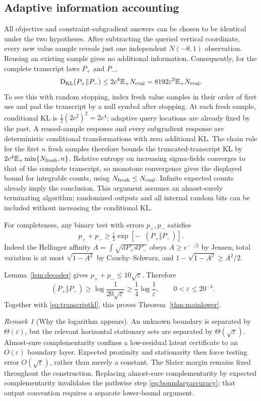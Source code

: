 \documentclass[11pt,a4paper]{article}
\newcommand{\E}{\mathbb E}
\newcommand{\eps}{\varepsilon}
\DeclareMathOperator{\KL}{D_{KL}}
\theoremstyle{remark}
\newtheorem{remark}[theorem]{Remark}
\numberwithin{equation}{section}
\begin{document}
\subsection{Adaptive information accounting}
All objective and constraint-subgradient answers can be chosen to be identical under the two hypotheses. After subtracting the queried vertical coordinate, every new value sample reveals just one independent $N(-\theta,1)$ observation. Reusing an existing sample gives no additional information. Consequently, for the complete transcript laws $P_+$ and $P_-$,
\begin{equation}
 \KL(P_+\Vert P_-)
 \le2c^4\E_+N_{\rm cval}
 =8192\eps^2\E_+N_{\rm cval}.
 \label{eq:transcriptkl}
\end{equation}
To see this with random stopping, index fresh value samples in their order of first use and pad the transcript by a null symbol after stopping. At each fresh sample, conditional KL is
$\tfrac12(2c^2)^2=2c^4$; adaptive query locations are already fixed by the past. A reused-sample response and every subgradient response are deterministic conditional transformations with zero additional KL. The chain rule for the first $n$ fresh samples therefore bounds the truncated-transcript KL by $2c^4\E_+\min\{N_{\rm fresh},n\}$. Relative entropy on increasing sigma-fields converges to that of the complete transcript, so monotone convergence gives the displayed bound for integrable counts, using $N_{\rm fresh}\le N_{\rm cval}$. Infinite expected counts already imply the conclusion. This argument assumes an almost-surely terminating algorithm; randomized outputs and all internal random bits can be included without increasing the conditional KL.

For completeness, any binary test with errors $p_+,p_-$ satisfies
\begin{equation}
 p_++p_-\ge\tfrac12\exp[-\KL(P_+\Vert P_-)].
 \label{eq:bh}
\end{equation}
Indeed the Hellinger affinity $A=\int\sqrt{dP_+dP_-}$ obeys $A\ge e^{-\KL/2}$ by Jensen, total variation is at most $\sqrt{1-A^2}$ by Cauchy--Schwarz, and
$1-\sqrt{1-A^2}\ge A^2/2$.

Lemma~\ref{lem:decoder} gives $p_++p_-\le10\sqrt\eps$. Therefore
\[
 \KL(P_+\Vert P_-)
 \ge\log\frac{1}{20\sqrt\eps}
 \ge\frac14\log\frac1\eps,
 \qquad 0<\eps\le20^{-4}.
\]
Together with \eqref{eq:transcriptkl}, this proves Theorem~\ref{thm:mainlower}.

\begin{remark}[Why the logarithm appears]
An unknown boundary is separated by $\Theta(\eps)$, but the relevant horizontal stationary sets are separated by $\Theta(\sqrt\eps)$. Almost-sure complementarity confines a low-residual latent certificate to an $O(\eps)$ boundary layer. Expected proximity and stationarity then force testing error $O(\sqrt\eps)$, rather than merely a constant. The Slater margin remains fixed throughout the construction. Replacing almost-sure complementarity by expected complementarity invalidates the pathwise step \eqref{eq:boundaryaccuracy}; that output convention requires a separate lower-bound argument.
\end{remark}
\end{document}
